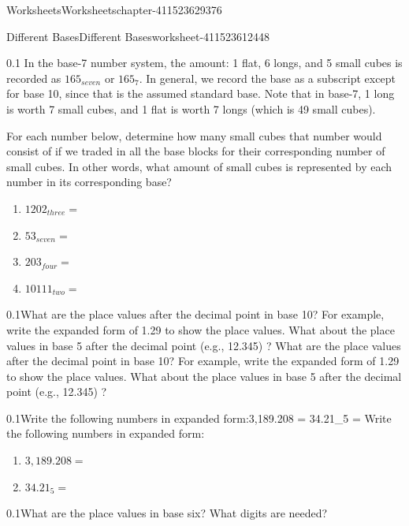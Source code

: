 \documentclass[twoside,11pt,]{book}
\begin{document}
\begin{chapterptx}{Worksheets}{}{Worksheets}{}{}{chapter-411523629376}
\begin{worksheet-section-numberless}{Different Bases}{}{Different Bases}{}{}{worksheet-411523612448}
\begin{divisionexercise}{1}{}{0.1}
\hypertarget{p-411523577584}{}%
In the base-7 number system, the amount: 1 flat, 6 longs, and 5 small cubes is recorded as \(165_{seven}\) or \(165_7\). In general, we record the base as a subscript except for base 10, since that is the assumed standard base.  Note that in base-7, 1 long is worth 7 small cubes, and 1 flat is worth 7 longs (which is 49 small cubes).%
\par
\hypertarget{p-411523510384}{}%
For each number below, determine how many small cubes that number would consist of if we traded in all the base blocks for their corresponding number of small cubes.  In other words, what amount of small cubes is represented by each number in its corresponding base?%
\leavevmode%
\begin{enumerate}[label=(\alph*)]
\item\hypertarget{li-411523509232}{}\(1202_{three}   = \)%
\item\hypertarget{li-411523508704}{}\(53_{seven}       = \)%
\item\hypertarget{li-411523508000}{}\(203_{four}       = \)%
\item\hypertarget{li-411523507296}{}\(10111_{two}       = \)%
\end{enumerate}
\end{divisionexercise}%
\begin{divisionexercise}{2}{}{0.1}{What are the place values after the decimal point in base 10? For example, write the expanded form of 1.29 to show the place values. What about the place values in base 5 after the decimal point (e.g., 12.345) ?}%
\hypertarget{p-411523505376}{}%
What are the place values after the decimal point in base 10? For example, write the expanded form of 1.29 to show the place values. What about the place values in base 5 after the decimal point (e.g., 12.345) ?%
\end{divisionexercise}%
\begin{divisionexercise}{3}{}{0.1}{Write the following numbers in expanded form:3,189.208 = 34.21_5      =  }%
\hypertarget{p-411523503680}{}%
Write the following numbers in expanded form:%
\leavevmode%
\begin{enumerate}[label=(\alph*)]
\item\hypertarget{li-411523502720}{}\(3,189.208 = \)%
\item\hypertarget{li-411523502176}{}\(34.21_5      = \)%
\end{enumerate}
\end{divisionexercise}%
\begin{divisionexercise}{4}{}{0.1}{What are the place values in base six?  What digits are needed?}%

\end{divisionexercise}
\end{worksheet-section-numberless}
\end{chapterptx}
\end{document}
